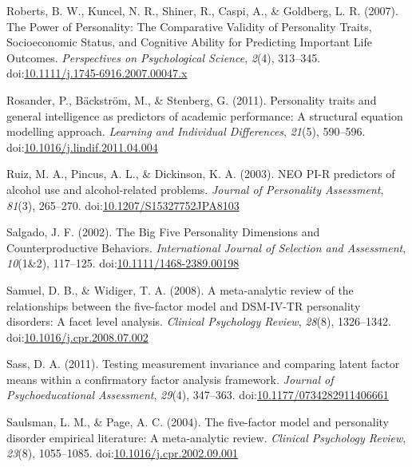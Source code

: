 \documentclass[,man,floatsintext]{apa6}
\begin{document}
\hypertarget{ref-Roberts2007}{}
Roberts, B. W., Kuncel, N. R., Shiner, R., Caspi, A., \& Goldberg, L. R.
(2007). The Power of Personality: The Comparative Validity of
Personality Traits, Socioeconomic Status, and Cognitive Ability for
Predicting Important Life Outcomes. \emph{Perspectives on Psychological
Science}, \emph{2}(4), 313--345.
doi:\href{https://doi.org/10.1111/j.1745-6916.2007.00047.x}{10.1111/j.1745-6916.2007.00047.x}

\hypertarget{ref-Rosander2011}{}
Rosander, P., Bäckström, M., \& Stenberg, G. (2011). Personality traits
and general intelligence as predictors of academic performance: A
structural equation modelling approach. \emph{Learning and Individual
Differences}, \emph{21}(5), 590--596.
doi:\href{https://doi.org/10.1016/j.lindif.2011.04.004}{10.1016/j.lindif.2011.04.004}

\hypertarget{ref-Ruiz2003}{}
Ruiz, M. A., Pincus, A. L., \& Dickinson, K. A. (2003). NEO PI-R
predictors of alcohol use and alcohol-related problems. \emph{Journal of
Personality Assessment}, \emph{81}(3), 265--270.
doi:\href{https://doi.org/10.1207/S15327752JPA8103}{10.1207/S15327752JPA8103}

\hypertarget{ref-Salgado2002}{}
Salgado, J. F. (2002). The Big Five Personality Dimensions and
Counterproductive Behaviors. \emph{International Journal of Selection
and Assessment}, \emph{10}(1\&2), 117--125.
doi:\href{https://doi.org/10.1111/1468-2389.00198}{10.1111/1468-2389.00198}

\hypertarget{ref-SamuelWidiger2008}{}
Samuel, D. B., \& Widiger, T. A. (2008). A meta-analytic review of the
relationships between the five-factor model and DSM-IV-TR personality
disorders: A facet level analysis. \emph{Clinical Psychology Review},
\emph{28}(8), 1326--1342.
doi:\href{https://doi.org/10.1016/j.cpr.2008.07.002}{10.1016/j.cpr.2008.07.002}

\hypertarget{ref-Sass2011}{}
Sass, D. A. (2011). Testing measurement invariance and comparing latent
factor means within a confirmatory factor analysis framework.
\emph{Journal of Psychoeducational Assessment}, \emph{29}(4), 347--363.
doi:\href{https://doi.org/10.1177/0734282911406661}{10.1177/0734282911406661}

\hypertarget{ref-SaulsmanPage2004}{}
Saulsman, L. M., \& Page, A. C. (2004). The five-factor model and
personality disorder empirical literature: A meta-analytic review.
\emph{Clinical Psychology Review}, \emph{23}(8), 1055--1085.
doi:\href{https://doi.org/10.1016/j.cpr.2002.09.001}{10.1016/j.cpr.2002.09.001}
\end{document}

